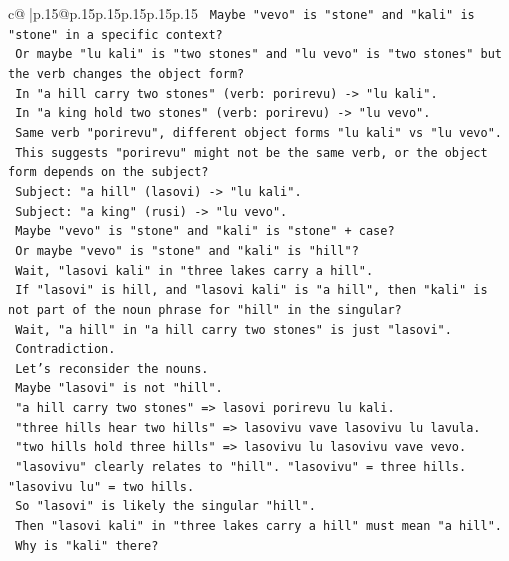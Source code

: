\documentclass{article}
\begin{document}
{\begin{supertabular}{c@{$\;$}|p{.15\linewidth}@{}p{.15\linewidth}p{.15\linewidth}p{.15\linewidth}p{.15\linewidth}p{.15\linewidth}}
{{{\texttt{   Maybe "vevo" is "stone" and "kali" is "stone" in a specific context?} \\
\texttt{   Or maybe "lu kali" is "two stones" and "lu vevo" is "two stones" but the verb changes the object form?} \\
\texttt{   In "a hill carry two stones" (verb: porirevu) {-}> "lu kali".} \\
\texttt{   In "a king hold two stones" (verb: porirevu) {-}> "lu vevo".} \\
\texttt{   Same verb "porirevu", different object forms "lu kali" vs "lu vevo".} \\
\texttt{   This suggests "porirevu" might not be the same verb, or the object form depends on the subject?} \\
\texttt{   Subject: "a hill" (lasovi) {-}> "lu kali".} \\
\texttt{   Subject: "a king" (rusi) {-}> "lu vevo".} \\
\texttt{   Maybe "vevo" is "stone" and "kali" is "stone" + case?} \\
\texttt{   Or maybe "vevo" is "stone" and "kali" is "hill"?} \\
\texttt{   Wait, "lasovi kali" in "three lakes carry a hill".} \\
\texttt{   If "lasovi" is hill, and "lasovi kali" is "a hill", then "kali" is not part of the noun phrase for "hill" in the singular?} \\
\texttt{   Wait, "a hill" in "a hill carry two stones" is just "lasovi".} \\
\texttt{   Contradiction.} \\
\texttt{   Let's reconsider the nouns.} \\
\texttt{   Maybe "lasovi" is not "hill".} \\
\texttt{   "a hill carry two stones" => lasovi porirevu lu kali.} \\
\texttt{   "three hills hear two hills" => lasovivu vave lasovivu lu lavula.} \\
\texttt{   "two hills hold three hills" => lasovivu lu lasovivu vave vevo.} \\
\texttt{   "lasovivu" clearly relates to "hill". "lasovivu" = three hills. "lasovivu lu" = two hills.} \\
\texttt{   So "lasovi" is likely the singular "hill".} \\
\texttt{   Then "lasovi kali" in "three lakes carry a hill" must mean "a hill".} \\
\texttt{   Why is "kali" there?} \\
}}}
\end{supertabular}}
\end{document}
